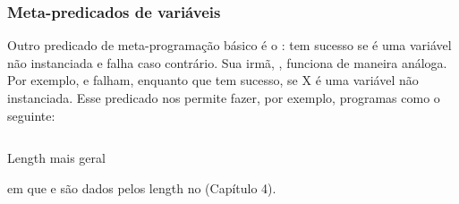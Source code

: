\documentclass{article}
\begin{document}
\subsubsection{Meta-predicados de variáveis}

Outro predicado de meta-programação básico é o :  tem sucesso se
 é uma variável não instanciada e falha caso contrário. Sua irmã, , funciona de maneira análoga. Por exemplo,  e  falham, enquanto que  tem sucesso, se X é uma variável não instanciada.
Esse predicado nos permite fazer, por exemplo, programas como o seguinte:

    \begin{listing}
\inputminted{prolog}{../Exemplos/Cap6/prog6_glength.pl}
\caption{Length mais geral}
    \end{listing}

\noindent em que  e  são dados pelos length no (Capítulo 4).

\end{document}
